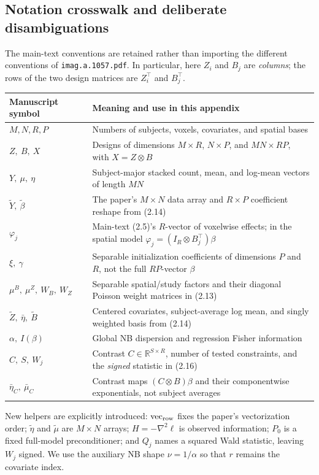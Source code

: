 \documentclass[11pt,a4paper]{article}
\newcommand{\R}{\mathbb R}
\numberwithin{equation}{section}
\begin{document}
\subsection{Notation crosswalk and deliberate disambiguations}
The main-text conventions are retained rather than importing the
different conventions of \texttt{imag.a.1057.pdf}.
In particular, here $Z_i$ and $B_j$ are \emph{columns}; the rows
of the two design matrices are $Z_i^\top$ and $B_j^\top$.
\begin{center}\small
\begin{tabularx}{\textwidth}{lT}
\toprule
Manuscript symbol & Meaning and use in this appendix\\
\midrule
$M,N,R,P$ & Numbers of subjects, voxels, covariates, and spatial bases\\
$Z,\ B,\ X$ & Designs of dimensions $M\times R$, $N\times P$,
and $MN\times RP$, with $X=Z\otimes B$\\
$Y,\ \mu,\ \eta$ & Subject-major stacked count, mean, and log-mean
vectors of length $MN$\\
$\widetilde Y,\ \widetilde\beta$ & The paper's $M\times N$ data array
and $R\times P$ coefficient reshape from (2.14)\\
$\varphi_j$ & Main-text (2.5)'s $R$-vector of voxelwise effects;
in the spatial model $\varphi_j=(I_R\otimes B_j^\top)\beta$\\
$\xi,\ \gamma$ & Separable initialization coefficients of dimensions
$P$ and $R$, not the full $RP$-vector $\beta$\\
$\mu^B,\ \mu^Z,\ W_B,\ W_Z$ & Separable spatial/study factors
and their diagonal Poisson weight matrices in (2.13)\\
$\widetilde Z,\ \bar\eta,\ \widetilde B$ & Centered covariates,
subject-average log mean, and singly weighted basis from (2.14)\\
$\alpha,\ I(\beta)$ & Global NB dispersion and regression Fisher information\\
$C,\ S,\ W_j$ & Contrast $C\in\R^{S\times R}$, number of tested
constraints, and the \emph{signed} statistic in (2.16)\\
$\bar\eta_C,\ \bar\mu_C$ & Contrast maps $(C\otimes B)\beta$
and their componentwise exponentials, not subject averages\\
\bottomrule
\end{tabularx}
\end{center}
New helpers are explicitly introduced: $\operatorname{vec}_{\rm row}$
fixes the paper's vectorization order; $\widetilde\eta$ and
$\widetilde\mu$ are $M\times N$ arrays; $H=-\nabla^2\ell$ is observed
information; $P_0$ is a fixed full-model preconditioner; and
$Q_j$ names a squared Wald statistic, leaving $W_j$ signed.
We use the auxiliary NB shape $\nu=1/\alpha$ so that $r$ remains
the covariate index.
\end{document}
